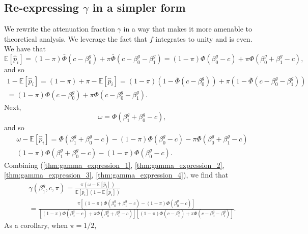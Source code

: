 \documentclass[12pt]{article}
\begin{document}
\begin{appendices}
\begin{refsection}
		\subsection{Re-expressing $\gamma$ in a simpler form}\label{sec:simplication}
		We rewrite the attenuation fraction $\gamma$ in a way that makes it more amenable to theoretical analysis. We leverage the fact that $f$ integrates to unity and is even. We have that
		\begin{equation}\label{thm:gamma_expression_1} \mathbb{E}\left[\hat{p}_i\right] = (1 - \pi) \bar{\Phi}(c - \beta_0^g) + \pi \bar{\Phi}(c - \beta^g_0 - \beta^g_1) = (1 - \pi) \Phi(\beta_0^g - c) + \pi\Phi(\beta^g_0 + \beta^g_1 - c), \end{equation}
		and so \begin{multline}\label{thm:gamma_expression_2} 1 - \mathbb{E}\left[\hat{p}_i\right] = (1 - \pi) + \pi - \mathbb{E}[\hat{p}_i]  = (1-\pi) \left(1 - \bar{\Phi}(c - \beta_0^g)\right)  + \pi \left(1 - \bar{\Phi}(c - \beta^g_0 - \beta^g_1) \right) \\ = (1 - \pi)\Phi(c - \beta^g_0) + \pi \Phi(c - \beta_0^g - \beta_1^g).
		\end{multline}
		Next,
		\begin{equation}\label{thm:gamma_expression_3}
		\omega = \Phi(\beta^g_1 + \beta^g_0 - c),\end{equation} and so
		\begin{multline}\label{thm:gamma_expression_4}
		\omega - \mathbb{E}[\hat{p}_i] = \Phi(\beta^g_1 + \beta^g_0 - c) - (1-\pi)\Phi(\beta^g_0 - c) - \pi \Phi(\beta^g_0 + \beta^g_1 - c)  \\ (1-\pi)\Phi(\beta^g_1 + \beta^g_0 - c)  - (1-\pi)\Phi(\beta^g_0 - c).
		\end{multline}
		Combining (\ref{thm:gamma_expression_1}, \ref{thm:gamma_expression_2}, \ref{thm:gamma_expression_3}, \ref{thm:gamma_expression_4}), we find that
		\begin{multline}\label{gamma_alternative}
		\gamma(\beta^g_1, c, \pi) = \frac{\pi(\omega - \mathbb{E}[\hat{p}_i])}{\mathbb{E}[\hat{p}_i](1 - \mathbb{E}[\hat{p}_i])} \\ = \frac{\pi \left[(1 - \pi) \Phi(\beta_0^g + \beta_1^g - c) - (1 - \pi) \Phi(\beta_0^g - c)\right]}{\left[(1-\pi)\Phi(\beta_0^g - c) + \pi \Phi(\beta^g_0 + \beta^g_1 - c) \right] \left[(1 - \pi) \Phi(c - \beta^g_0) + \pi\Phi(c - \beta_0^g - \beta_1^g) \right]}.
		\end{multline}
		As a corollary, when $\pi = 1/2$,
		\begin{equation}\label{gamma_alternative_pi_half}

\end{equation}
\end{refsection}
\end{appendices}
\end{document}
